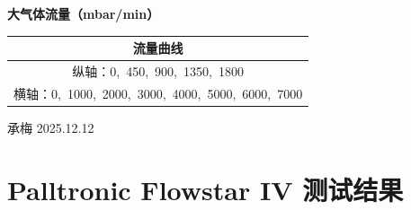 \documentclass[UTF8,10pt,a4paper,fontset=fandol]{ctexart}
\newcommand{\fieldvalue}[1]{#1}
\newcommand{\handwritten}[1]{#1}
\begin{document}
\begin{center}
\setlength{\fboxsep}{6pt}
\begin{minipage}{0.78\linewidth}
\centering
\textbf{大气体流量（mbar/min）}

\vspace{0.3em}
\begin{tabular}{c|c}
\hline
\multicolumn{2}{c}{流量曲线} \\
\hline
\multicolumn{2}{c}{纵轴：0,\ 450,\ 900,\ 1350,\ 1800} \\
\hline
\multicolumn{2}{c}{横轴：0,\ 1000,\ 2000,\ 3000,\ 4000,\ 5000,\ 6000,\ 7000} \\
\hline
\end{tabular}

\vspace{0.5em}
\end{minipage}
\end{center}

\fieldvalue{\handwritten{承梅 2025.12.12}}

\newpage

\section*{Palltronic Flowstar IV 测试结果}
\end{document}
